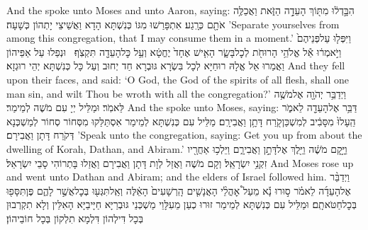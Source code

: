 {And the \lord\space spoke unto Moses and unto Aaron, saying:}{}
{הִבָּ֣דְל֔וּ מִתּ֖וֹךְ הָעֵדָ֣ה הַזֹּ֑את וַאֲכַלֶּ֥ה אֹתָ֖ם כְּרָֽגַע׃}
{אִתְפָּרַשׁוּ מִגּוֹ כְּנִשְׁתָּא הָדָא וַאֲשֵׁיצֵי יָתְהוֹן כְּשָׁעָה׃}
{’Separate yourselves from among this congregation, that I may consume them in a moment.’}{}
{וַיִּפְּל֤וּ עַל\maqqaf פְּנֵיהֶם֙ וַיֹּ֣אמְר֔וּ אֵ֕ל אֱלֹהֵ֥י הָרוּחֹ֖ת לְכׇל\maqqaf בָּשָׂ֑ר הָאִ֤ישׁ אֶחָד֙ יֶחֱטָ֔א וְעַ֥ל כׇּל\maqqaf הָעֵדָ֖ה תִּקְצֹֽף׃ \setuma }
{וּנְפַלוּ עַל אַפֵּיהוֹן וַאֲמַרוּ אֵל אֱלָהּ רוּחַיָּא לְכָל בִּשְׂרָא גּוּבְרָא חַד יְחוּב וְעַל כָּל כְּנִשְׁתָּא יְהֵי רוּגְזָא׃}
{And they fell upon their faces, and said: ‘O God, the God of the spirits of all flesh, shall one man sin, and wilt Thou be wroth with all the congregation?’}{}
{וַיְדַבֵּ֥ר יְהֹוָ֖ה אֶל\maqqaf מֹשֶׁ֥ה לֵּאמֹֽר׃}
{וּמַלֵּיל יְיָ עִם מֹשֶׁה לְמֵימַר׃}
{And the \lord\space spoke unto Moses, saying:}{}
{דַּבֵּ֥ר אֶל\maqqaf הָעֵדָ֖ה לֵאמֹ֑ר הֵֽעָלוּ֙ מִסָּבִ֔יב לְמִשְׁכַּן\maqqaf קֹ֖רַח דָּתָ֥ן וַאֲבִירָֽם׃}
{מַלֵּיל עִם כְּנִשְׁתָּא לְמֵימַר אִסְתַּלַּקוּ מִסְּחוֹר סְחוֹר לְמַשְׁכְּנָא דְּקֹרַח דָּתָן וַאֲבִירָם׃}
{’Speak unto the congregation, saying: Get you up from about the dwelling of Korah, Dathan, and Abiram.’}{}
{וַיָּ֣קׇם מֹשֶׁ֔ה וַיֵּ֖לֶךְ אֶל\maqqaf דָּתָ֣ן וַאֲבִירָ֑ם וַיֵּלְכ֥וּ אַחֲרָ֖יו זִקְנֵ֥י יִשְׂרָאֵֽל׃}
{וְקָם מֹשֶׁה וַאֲזַל לְוָת דָּתָן וַאֲבִירָם וַאֲזַלוּ בָּתְרוֹהִי סָבֵי יִשְׂרָאֵל׃}
{And Moses rose up and went unto Dathan and Abiram; and the elders of Israel followed him.}{}
{וַיְדַבֵּ֨ר אֶל\maqqaf הָעֵדָ֜ה לֵאמֹ֗ר ס֣וּרוּ נָ֡א מֵעַל֩ אׇהֳלֵ֨י הָאֲנָשִׁ֤ים הָֽרְשָׁעִים֙ הָאֵ֔לֶּה וְאַֽל\maqqaf תִּגְּע֖וּ בְּכׇל\maqqaf אֲשֶׁ֣ר לָהֶ֑ם פֶּן\maqqaf תִּסָּפ֖וּ בְּכׇל\maqqaf חַטֹּאתָֽם׃}
{וּמַלֵּיל עִם כְּנִשְׁתָּא לְמֵימַר זוּרוּ כְעַן מֵעִלָּוֵי מַשְׁכְּנֵי גּוּבְרַיָּא חַיָּיבַיָּא הָאִלֵּין וְלָא תִקְרְבוּן בְּכָל דִּילְהוֹן דִּלְמָא תִלְקוֹן בְּכָל חוֹבֵיהוֹן׃}
